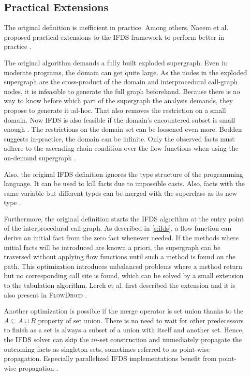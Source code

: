 \documentclass[../draft.tex]{subfiles}
\begin{document}
  
    \subsection{Practical Extensions}\label{s:ifdspractical}
    The original definition is inefficient in practice. 
    Among others, Naeem et al. proposed practical extensions to the IFDS framework to perform better in practice \cite{Naeem2010}.

    The original algorithm demands a fully built exploded supergraph.
    Even in moderate programs, the domain can get quite large. 
    As the nodes in the exploded supergraph are the cross-product of the domain and interprocedural call-graph nodes, it is infeasible to generate the full graph beforehand. 
    Because there is no way to know before which part of the supergraph the analysis demands, they propose to generate it ad-hoc. 
    That also removes the restriction on a small domain. 
    Now IFDS is also feasible if the domain's encountered subset is small enough \cite{Naeem2010}.
    The restrictions on the domain set can be loosened even more. 
    Bodden suggests in-practice, the domain can be infinite. 
    Only the observed facts must adhere to the ascending-chain condition over the flow functions when using the on-demand supergraph \cite{Bodden2012}.
    
    Also, the original IFDS definition ignores the type structure of the programming language. 
    It can be used to kill facts due to impossible casts. 
    Also, facts with the same variable but different types can be merged with the superclass as its new type \cite{Naeem2010}.

    Furthermore, the original definition starts the IFDS algorithm at the entry point of the interprocedural call-graph. 
    As described in \autoref{s:ifds}, a flow function can derive an initial fact from the zero fact whenever needed. 
    If the methods where initial facts will be introduced are known a priori, the supergraph can be traversed without applying flow functions until such a method is found on the path. 
    This optimization introduces unbalanced problems where a method return but no corresponding call site is found, which can be solved by a small extension to the tabulation algorithm. 
    Lerch et al. first described the extension \cite{Lerch2015} and it is also present in \textsc{FlowDroid} \cite{Arzt2017PhD}.

    Another optimization is possible if the merge operator is set union thanks to the $A \subseteq A \cup B$ property of set union. 
    There is no need to wait for other predecessors to finish as a set is always a subset of a union with itself and another set.
    Hence, the IFDS solver can skip the $in$-set construction and immediately propagate the outcoming facts as singleton sets, sometimes referred to as point-wise propagation. 
    Especially parallelized IFDS implementations benefit from point-wise propagation \cite{Rodriguez2011}.
\end{document}
